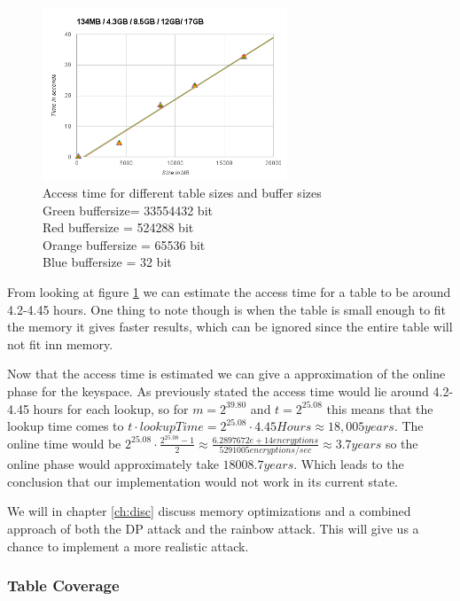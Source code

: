 \begin{figure}[H]
  \centering
  \includegraphics[width=0.65\textwidth]{figures/AccessTime.png}
  \caption{Access time for different table sizes and buffer sizes\\
    Green buffersize= 33554432 bit\\
    Red buffersize = 524288 bit\\
    Orange buffersize = 65536 bit\\
    Blue buffersize = 32 bit\\
    }
  \label{fig:tableAccess}
\end{figure}

From looking at figure \ref{fig:tableAccess} we can estimate the
access time for a  table to be around 4.2-4.45 hours.
One thing to note though is when the table is small enough to fit the
memory it gives faster results, which can be ignored since the entire
 table will not fit inn memory. 

Now that the access time is estimated we can give a approximation of
the online phase for the  keyspace. As previously stated
the access time would lie around 4.2-4.45 hours for each lookup, so
for $m=2^{39.80}$ and $t=2^{25.08}$ this means that the lookup time
comes to $t\cdot lookupTime=2^{25.08}\cdot 4.45 Hours \approx 18,005
years$. The online time would be
$2^{25.08}\cdot\frac{2^{25.08}-1}{2}\approx \frac{6.2897672e+14encryptions}{5291005 encryptions/sec} \approx 3.7 years$ so the
online phase would approximately take $18008.7 years$. Which leads to
the conclusion that our implementation would not work in its current
state. 

We will in chapter \ref{ch:disc} discuss memory optimizations and a
combined approach of both the DP attack and the rainbow attack. This
will give us a chance to implement a more realistic attack.
\subsubsection{Table Coverage}

